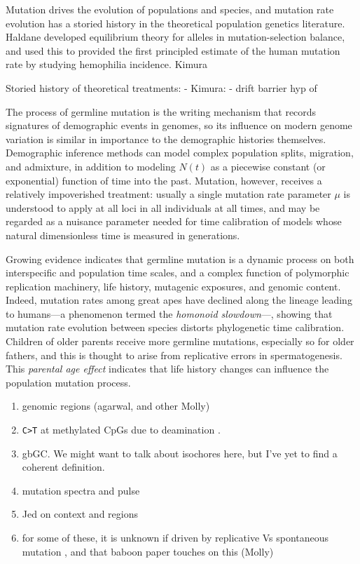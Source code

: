 \documentclass[11pt]{article}
\begin{document}
Mutation drives the evolution of populations and species, and mutation rate evolution has a storied history in the theoretical population genetics literature.
Haldane developed equilibrium theory for alleles in mutation-selection balance, and used this to provided the first principled estimate of the human mutation rate by studying hemophilia incidence\cite{Haldane2004-ov, Nachman2004-gh}.
Kimura  \cite{Kimura1967-ku}

Storied history of theoretical treatments:
- Kimura: \cite{Kimura1967-ku}
- drift barrier hyp of \cite{Lynch2016-ff}

The process of germline mutation is the writing mechanism that records signatures of demographic events in genomes, so its influence on modern genome variation is similar in importance to the demographic histories themselves.
Demographic inference methods can model complex population splits, migration, and admixture, in addition to modeling $N(t)$ as a piecewise constant (or exponential) function of time into the past.
Mutation, however, receives a relatively impoverished treatment: usually a single mutation rate parameter $\mu$ is understood to apply at all loci in all individuals at all times, and may be regarded as a nuisance parameter needed for time calibration of models whose natural dimensionless time is measured in generations.

Growing evidence indicates that germline mutation is a dynamic process on both interspecific and population time scales, and a complex function of polymorphic replication machinery, life history, mutagenic exposures, and genomic content.
Indeed, mutation rates among great apes have declined along the lineage leading to humans---a phenomenon termed the \emph{homonoid slowdown}\cite{Goodman1985-xc, Scally2012-rb}---, showing that mutation rate evolution between species distorts phylogenetic time calibration.
Children of older parents receive more germline mutations, especially so for older fathers, and this is thought to arise from replicative errors in spermatogenesis.
This \emph{parental age effect} \cite{} indicates that life history changes can influence the population mutation process.


\begin{enumerate}
\item genomic regions (agarwal, and other Molly)
\item \texttt{C>T} at methylated CpGs due to deamination \cite{?}.
\item gbGC. We might want to talk about isochores here, but I've yet to find a coherent definition.
\item mutation spectra and pulse \cite{Harris2015-wi, Harris2017-fw}
\item Jed on context and regions \cite{Carlson2018-rc}
\item for some of these, it is unknown if driven by replicative Vs spontaneous mutation \cite{Gao2016-qp}, and that baboon paper touches on this (Molly)
\end{enumerate}
\end{document}
